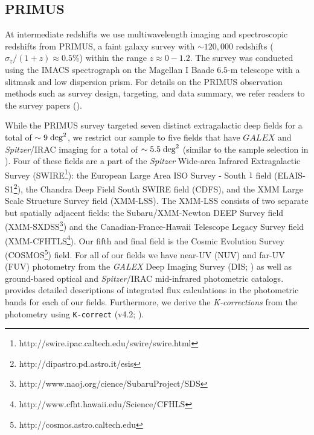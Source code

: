 \documentclass{emulateapj}
\begin{document}
\subsection{PRIMUS} \label{sec:primus}
At intermediate redshifts we use multiwavelength imaging and
spectroscopic redshifts from PRIMUS, a faint galaxy survey with $\sim
120,000$ redshifts ($\sigma_z/(1+z) \approx 0.5 \%$) within the range
$z \approx 0-1.2$. The survey was conducted using the IMACS
spectrograph on the Magellan I Baade $6.5$-m telescope with a slitmask and low dispersion prism. For details on the PRIMUS observation methods such as survey design, targeting, and data summary, we refer readers to the survey papers (\citealt{Coil:2011aa, Cool:2013aa}). 

While the PRIMUS survey targeted seven distinct extragalactic deep fields for a total of $\sim 9 \; \rm{deg}^2$, we restrict our sample to five fields that have $GALEX$ and {\em Spitzer}/IRAC imaging for a total of $\sim 5.5 \; \rm{deg}^2$ (similar to the sample selection in \citealt{Moustakas:2013aa}). Four of these fields are a part of the {\em Spitzer} Wide-area Infrared Extragalactic Survey (SWIRE\footnote{http://swire.ipac.caltech.edu/swire/swire.html}): the European Large Area ISO Survey - South $1$ field (ELAIS-S1\footnote{http://dipastro.pd.astro.it/esis}), the Chandra Deep Field South SWIRE field (CDFS), and the XMM Large Scale Structure Survey field (XMM-LSS). The XMM-LSS consists of two separate but spatially adjacent fields: the Subaru/XMM-Newton DEEP Survey field (XMM-SXDSS\footnote{http://www.naoj.org/cience/SubaruProject/SDS}) and the Canadian-France-Hawaii Telescope Legacy Survey field (XMM-CFHTLS\footnote{http://www.cfht.hawaii.edu/Science/CFHLS}). Our fifth and final field is the Cosmic Evolution Survey (COSMOS\footnote{http://cosmos.astro.caltech.edu}) field. For all of our fields we have near-UV (NUV) and far-UV (FUV) photometry from the {\em GALEX} Deep Imaging Survey (DIS; \citealt{Martin:2005aa, Morrissey:2005aa}) as well as ground-based optical and {\em Spitzer}/IRAC mid-infrared photometric catalogs. \cite{Moustakas:2013aa} provides detailed descriptions of integrated flux calculations in the photometric bands for each of our fields. Furthermore, we derive the {\em K-corrections} from the photometry using \texttt{K-correct} (v4.2; \citealt{Blanton:2007aa}). 
\end{document}
